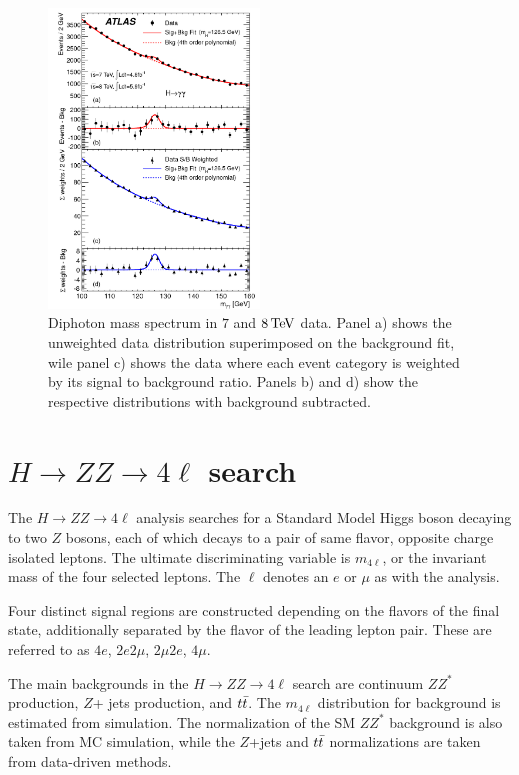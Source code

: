 \begin{figure}[h!]
  \centering
  \captionsetup{justification=centering}
  \includegraphics[width=0.5\textwidth]{figures/discovery_mgg}
  \caption{Diphoton mass spectrum in $7$ and $8 \TeV$ data. Panel a) shows the unweighted data distribution superimposed on the background fit, wile panel c) shows the data where each event category is weighted by its signal to background ratio. Panels b) and d) show the respective distributions with background subtracted\cite{Discovery}.}
  \label{fig:disc_mgg}
\end{figure}

\section{$H\to ZZ \to 4\ell$ search}

The $H\to ZZ \to 4\ell$ analysis searches for a Standard Model Higgs boson decaying to two $Z$ bosons, each of which decays to a pair of same flavor, opposite charge isolated leptons. The ultimate discriminating variable is $m_{4\ell}$, or the invariant mass of the four selected leptons. The $\ell$ denotes an $e$ or $\mu$ as with the \HWWfull analysis. 

Four distinct signal regions are constructed depending on the flavors of the final state, additionally separated by the flavor of the leading lepton pair. These are referred to as $4e$, $2e2\mu$, $2\mu2e$, $4\mu$. 

The main backgrounds in the $H\to ZZ \to 4\ell$ search are continuum $ZZ^*$ production, $Z$+ jets production, and $t\bar{t}$. The $m_{4\ell}$ distribution for background is estimated from simulation. The normalization of the SM $ZZ^*$ background is also taken from MC simulation, while the $Z$+jets and $t\bar{t}$ normalizations are taken from data-driven methods.

